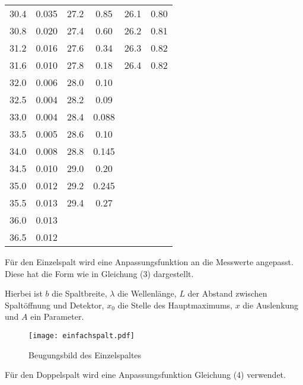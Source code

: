 \begin{longtable}{S[table-format=3.2] S[table-format=3.2] S[table-format=3.2] S[table-format=3.2] S[table-format=3.2] S[table-format=3.2]}
          30.4   &   0.035  &     27.2    &  0.85   & 26.1   &   0.80                                      \\
          30.8   &   0.020  &     27.4    &  0.60   & 26.2   &   0.81                                      \\
          31.2   &   0.016  &     27.6    &  0.34   & 26.3   &   0.82                                      \\
          31.6   &   0.010  &     27.8    &  0.18   & 26.4   &   0.82                                      \\
          32.0   &   0.006  &     28.0    &  0.10                                                          \\
          32.5   &   0.004  &     28.2    &  0.09                                                          \\
          33.0   &   0.004  &     28.4    & 0.088                                                          \\
          33.5   &   0.005  &     28.6    &  0.10                                     \\
          34.0   &   0.008  &     28.8    & 0.145                                     \\
          34.5   &   0.010  &     29.0    &  0.20                                     \\
          35.0   &   0.012  &     29.2    & 0.245                                     \\
          35.5   &   0.013  &     29.4    &  0.27                                     \\
          36.0   &   0.013  &                                     \\
          36.5   &   0.012  &                                     \\
                \bottomrule
\end{longtable}

Für den Einzelspalt wird eine Anpassungsfunktion an die Messwerte angepasst. Diese hat die Form wie
in Gleichung (3) dargestellt.

Hierbei ist $b$ die Spaltbreite, $\lambda$ die Wellenlänge, $L$ der Abstand zwischen Spaltöffnung und Detektor,
$x_0$ die Stelle des Hauptmaximums, $x$ die Auslenkung und $A$ ein Parameter.

\begin{figure}
  \centering
  \texttt{[image: einfachspalt.pdf]}
  \caption{Beugungsbild des Einzelspaltes}
  \label{fig:plot}
\end{figure}


Für den Doppelspalt wird eine Anpassungsfunktion Gleichung (4) verwendet.
